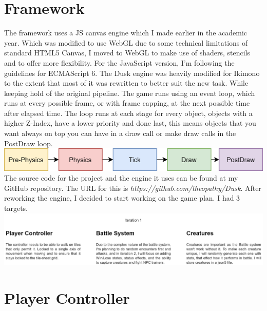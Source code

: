 \documentclass[11pt,a4paper]{article}
\begin{document}
\section{Framework}
The framework uses a JS canvas engine which I made earlier in the academic year. Which was modified to use WebGL due to some technical limitations of standard HTML5 Canvas, I moved to WebGL to make use of shaders, stencils and to offer more flexibility. For the JavaScript version, I'm following the guidelines for ECMAScript 6. The Dusk engine was heavily modified for Ikimono to the extent that most of it was rewritten to better suit the new task. While keeping hold of the original pipeline. The game runs using an event loop, which runs at every possible frame, or with frame capping, at the next possible time after elapsed  time. The loop runs at each stage for every object, objects with a higher Z-Index, have a lower priority and done last, this means objects that you want always on top you can have in a draw call or make draw calls in the PostDraw loop.\newline
\includegraphics[width=\textwidth]{download (1).png}
The source code for the project and the engine it uses can be found at my GitHub repository. The URL for this is \textit{https://github.com/theopathy/Dusk}.
After reworking the engine, I decided to start working on the game plan. I had 3 targets. \newline
\includegraphics[width=\textwidth]{download (3).png}

\section{Player Controller}
\end{document}
